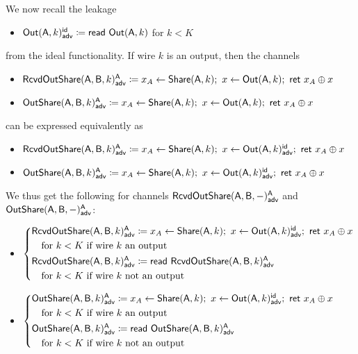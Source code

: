 \noindent We now recall the leakage
\begin{itemize}
\item {\color{blue} $\mathsf{Out}(\mathsf{A},k)^{\mathsf{id}}_{\mathsf{adv}} \coloneqq \mathsf{read} \ \mathsf{Out}(\mathsf{A},k)$ for $k < K$}
\end{itemize}
from the ideal functionality. If wire $k$ is an output, then the channels
\begin{itemize}
\item {\color{blue} $\mathsf{RcvdOutShare}(\mathsf{A},\mathsf{B},k)^{\mathsf{A}}_{\mathsf{adv}} \coloneqq x_A \leftarrow \mathsf{Share}(\mathsf{A},k); \ x \leftarrow \mathsf{Out}(\mathsf{A},k); \ \mathsf{ret} \ x_A \oplus x$}
\item {\color{blue} $\LeakOutShare(\A,\B,k)^\A_\adv \coloneqq x_A \leftarrow \Share(\A,k); \ x \leftarrow \Out(\A,k); \ \ret{x_A \oplus x}$}
\end{itemize}
can be expressed equivalently as
\begin{itemize}
\item {\color{blue} $\LeakRcvdOutShare(\A,\B,k)^\A_\adv \coloneqq x_A \leftarrow \Share(\A,k); \ x \leftarrow \LeakOut(\A,k)^\id_\adv; \ \ret{x_A \oplus x}$}
\item {\color{blue} $\mathsf{OutShare}(\mathsf{A},\mathsf{B},k)^{\mathsf{A}}_{\mathsf{adv}} \coloneqq x_A \leftarrow \mathsf{Share}(\mathsf{A},k); \ x \leftarrow \mathsf{Out}(\mathsf{A},k)^{\mathsf{id}}_{\mathsf{adv}}; \ \mathsf{ret} \ x_A \oplus x$}
\end{itemize}
We thus get the following for channels $\mathsf{RcvdOutShare}(\mathsf{A},\mathsf{B},-)^{\mathsf{A}}_{\mathsf{adv}}$ and $\mathsf{OutShare}(\mathsf{A},\mathsf{B},-)^{\mathsf{A}}_{\mathsf{adv}}$: 
\begin{itemize}
\item {\color{blue} $\begin{cases*} \LeakRcvdOutShare(\A,\B,k)^\A_\adv \coloneqq x_A \leftarrow \Share(\A,k); \ x \leftarrow \LeakOut(\A,k)^\id_\adv; \ \ret{x_A \oplus x} \\ \hspace{10pt} \text{for $k < K$ if wire $k$ an output} \\ \LeakRcvdOutShare(\A,\B,k)^\A_\adv \coloneqq \read{\LeakRcvdOutShare(\A,\B,k)^\A_\adv} \\ \hspace{10pt} \text{for $k < K$ if wire $k$ not an output} \end{cases*}$}
\item {\color{blue} $\begin{cases*} \LeakOutShare(\A,\B,k)^\A_\adv \coloneqq x_A \leftarrow \Share(\A,k); \ x \leftarrow \LeakOut(\A,k)^\id_\adv; \ \ret{x_A \oplus x} \\ \hspace{10pt} \text{for $k < K$ if wire $k$ an output} \\ \LeakOutShare(\A,\B,k)^\A_\adv \coloneqq \read{\LeakOutShare(\A,\B,k)^\A_\adv} \\ \hspace{10pt} \text{for $k < K$ if wire $k$ not an output} \end{cases*}$}
\end{itemize}
